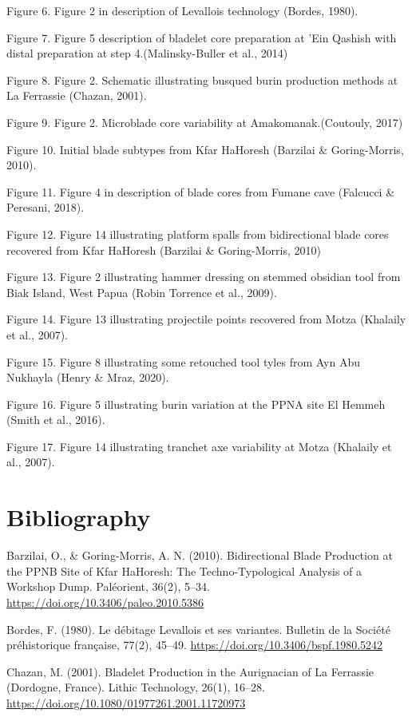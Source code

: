 \documentclass[
]{article}
\begin{document}
Figure 6. Figure 2 in description of Levallois technology (Bordes,
1980).

Figure 7. Figure 5 description of bladelet core preparation at 'Ein
Qashish with distal preparation at step 4.(Malinsky-Buller et al., 2014)

Figure 8. Figure 2. Schematic illustrating busqued burin production
methods at La Ferrassie (Chazan, 2001).

Figure 9. Figure 2. Microblade core variability at Amakomanak.(Coutouly,
2017)

Figure 10. Initial blade subtypes from Kfar HaHoresh (Barzilai \&
Goring-Morris, 2010).

Figure 11. Figure 4 in description of blade cores from Fumane cave
(Falcucci \& Peresani, 2018).

Figure 12. Figure 14 illustrating platform spalls from bidirectional
blade cores recovered from Kfar HaHoresh (Barzilai \& Goring-Morris,
2010)

Figure 13. Figure 2 illustrating hammer dressing on stemmed obsidian
tool from Biak Island, West Papua (Robin Torrence et al., 2009).

Figure 14. Figure 13 illustrating projectile points recovered from Motza
(Khalaily et al., 2007).

Figure 15. Figure 8 illustrating some retouched tool tyles from Ayn Abu
Nukhayla (Henry \& Mraz, 2020).

Figure 16. Figure 5 illustrating burin variation at the PPNA site El
Hemmeh (Smith et al., 2016).

Figure 17. Figure 14 illustrating tranchet axe variability at Motza
(Khalaily et al., 2007).

\section{Bibliography}\label{bibliography}

Barzilai, O., \& Goring-Morris, A. N. (2010). Bidirectional Blade
Production at the PPNB Site of Kfar HaHoresh: The Techno-Typological
Analysis of a Workshop Dump. Paléorient, 36(2), 5--34.
\url{https://doi.org/10.3406/paleo.2010.5386}

Bordes, F. (1980). Le débitage Levallois et ses variantes. Bulletin de
la Société préhistorique française, 77(2), 45--49.
\url{https://doi.org/10.3406/bspf.1980.5242}

Chazan, M. (2001). Bladelet Production in the Aurignacian of La
Ferrassie (Dordogne, France). Lithic Technology, 26(1), 16--28.
\url{https://doi.org/10.1080/01977261.2001.11720973}
\end{document}
